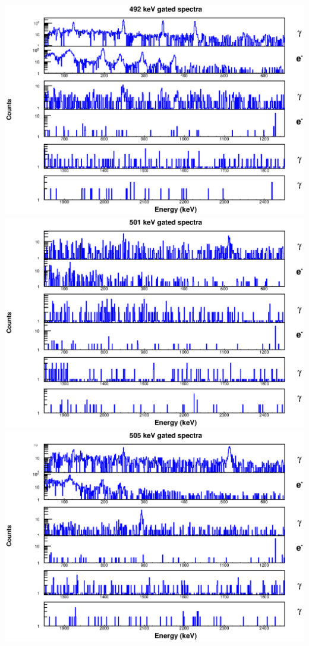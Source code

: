 \includegraphics[scale=0.8]{154Gd_Appendix/492_combined.eps}
\includegraphics[scale=0.8]{154Gd_Appendix/501_combined.eps}
\includegraphics[scale=0.8]{154Gd_Appendix/505_combined.eps}
